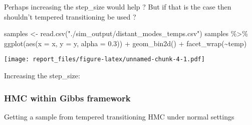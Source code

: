 \documentclass[
]{article}
\newenvironment{Shaded}{\begin{snugshade}}{\end{snugshade}}
\newcommand{\AttributeTok}[1]{\textcolor[rgb]{0.77,0.63,0.00}{#1}}
\newcommand{\FloatTok}[1]{\textcolor[rgb]{0.00,0.00,0.81}{#1}}
\newcommand{\FunctionTok}[1]{\textcolor[rgb]{0.00,0.00,0.00}{#1}}
\newcommand{\NormalTok}[1]{#1}
\newcommand{\OtherTok}[1]{\textcolor[rgb]{0.56,0.35,0.01}{#1}}
\newcommand{\SpecialCharTok}[1]{\textcolor[rgb]{0.00,0.00,0.00}{#1}}
\newcommand{\StringTok}[1]{\textcolor[rgb]{0.31,0.60,0.02}{#1}}
\begin{document}
Perhaps increasing the step\_size would help ? But if that is the case
then shouldn't tempered transitioning be used ?

\begin{Shaded}
\begin{Highlighting}[]
\NormalTok{samples }\OtherTok{\textless{}{-}} \FunctionTok{read.csv}\NormalTok{(}\StringTok{"./sim\_output/distant\_modes\_temps.csv"}\NormalTok{)}
\NormalTok{samples }\SpecialCharTok{\%\textgreater{}\%}
    \FunctionTok{ggplot}\NormalTok{(}\FunctionTok{aes}\NormalTok{(}\AttributeTok{x =}\NormalTok{ x, }\AttributeTok{y =}\NormalTok{ y, }\AttributeTok{alpha =} \FloatTok{0.3}\NormalTok{)) }\SpecialCharTok{+} \FunctionTok{geom\_bin2d}\NormalTok{() }\SpecialCharTok{+} \FunctionTok{facet\_wrap}\NormalTok{(}\SpecialCharTok{\textasciitilde{}}\NormalTok{temp)}
\end{Highlighting}
\end{Shaded}

\texttt{[image: report\_files/figure-latex/unnamed-chunk-4-1.pdf]}

Increasing the step\_size:

\hypertarget{hmc-within-gibbs-framework}{%
\subsubsection{HMC within Gibbs
framework}\label{hmc-within-gibbs-framework}}

Getting a sample from tempered transitioning HMC under normal settings
\end{document}
